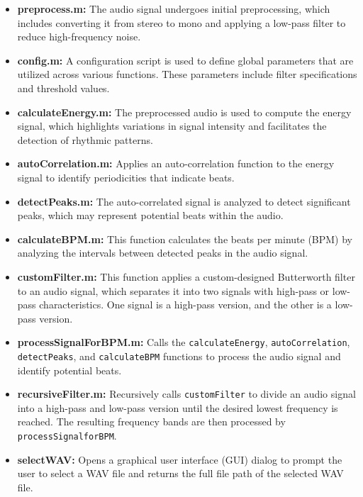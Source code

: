 \begin{itemize}
    \item \textbf{preprocess.m:} The audio signal undergoes initial preprocessing, which includes converting it from stereo to mono and applying a low-pass filter to reduce high-frequency noise.
    \item \textbf{config.m:} A configuration script is used to define global parameters that are utilized across various functions. These parameters include filter specifications and threshold values.
    \item \textbf{calculateEnergy.m:} The preprocessed audio is used to compute the energy signal, which highlights variations in signal intensity and facilitates the detection of rhythmic patterns.
    \item \textbf{autoCorrelation.m:} Applies an auto-correlation function to the energy signal to identify periodicities that indicate beats.
    \item \textbf{detectPeaks.m:} The auto-correlated signal is analyzed to detect significant peaks, which may represent potential beats within the audio.
    \item \textbf{calculateBPM.m:} This function calculates the beats per minute (BPM) by analyzing the intervals between detected peaks in the audio signal.
    \item \textbf{customFilter.m:} This function applies a custom-designed Butterworth filter to an audio signal, which separates it into two signals with high-pass or low-pass characteristics. One signal is a high-pass version, and the other is a low-pass version.
    \item \textbf{processSignalForBPM.m:} Calls the \texttt{calculateEnergy}, \texttt{autoCorrelation}, \texttt{detectPeaks}, and \texttt{calculateBPM} functions to process the audio signal and identify potential beats.
    \item \textbf{recursiveFilter.m:} Recursively calls \texttt{customFilter} to divide an audio signal into a high-pass and low-pass version until the desired lowest frequency is reached. The resulting frequency bands are then processed by \texttt{processSignalforBPM}.
    \item \textbf{selectWAV:} Opens a graphical user interface (GUI) dialog to prompt the user to select a WAV file and returns the full file path of the selected WAV file.
\end{itemize}

